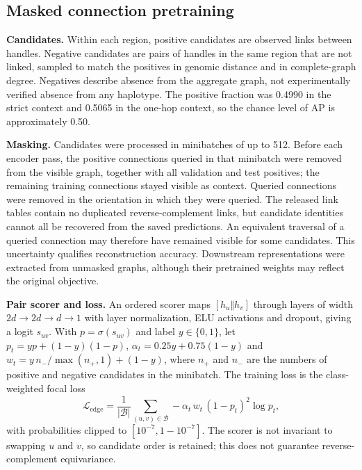 \documentclass[11pt]{article}
\begin{document}
\begin{bibunit}[unsrtnat]
\subsection{Masked connection pretraining}
\label{sec:objective}

\textbf{Candidates.} Within each region, positive candidates are observed links between handles. Negative candidates are pairs of handles in the same region that are not linked, sampled to match the positives in genomic distance and in complete-graph degree. Negatives describe absence from the aggregate graph, not experimentally verified absence from any haplotype. The positive fraction was 0.4990 in the strict context and 0.5065 in the one-hop context, so the chance level of AP is approximately 0.50.

\textbf{Masking.} Candidates were processed in minibatches of up to 512. Before each encoder pass, the positive connections queried in that minibatch were removed from the visible graph, together with all validation and test positives; the remaining training connections stayed visible as context. Queried connections were removed in the orientation in which they were queried. The released link tables contain no duplicated reverse-complement links, but candidate identities cannot all be recovered from the saved predictions. An equivalent traversal of a queried connection may therefore have remained visible for some candidates. This uncertainty qualifies reconstruction accuracy. Downstream representations were extracted from unmasked graphs, although their pretrained weights may reflect the original objective.

\textbf{Pair scorer and loss.} An ordered scorer maps $[h_u\Vert h_v]$ through layers of width $2d\rightarrow2d\rightarrow d\rightarrow1$ with layer normalization, ELU activations and dropout, giving a logit $s_{uv}$. With $p=\sigma(s_{uv})$ and label $y\in\{0,1\}$, let $p_t=yp+(1-y)(1-p)$, $\alpha_t=0.25y+0.75(1-y)$ and $w_t=y\,n_-/\max(n_+,1)+(1-y)$, where $n_+$ and $n_-$ are the numbers of positive and negative candidates in the minibatch. The training loss is the class-weighted focal loss\cite{lin2017focal}
\begin{equation}
\mathcal{L}_{\mathrm{edge}}=\frac{1}{|\mathcal{B}|}\sum_{(u,v)\in\mathcal{B}}-\alpha_t\,w_t\,(1-p_t)^{2}\log p_t ,
\end{equation}
with probabilities clipped to $[10^{-7},1-10^{-7}]$. The scorer is not invariant to swapping $u$ and $v$, so candidate order is retained; this does not guarantee reverse-complement equivariance.


\end{bibunit}
\end{document}
